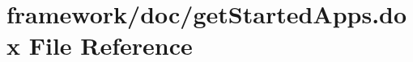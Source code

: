 \hypertarget{get_started_apps_8dox}{}\section{framework/doc/get\+Started\+Apps.dox File Reference}
\label{get_started_apps_8dox}
